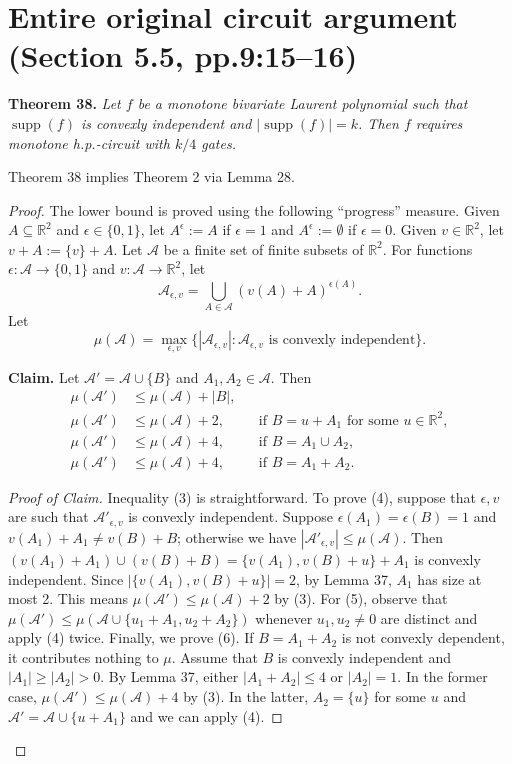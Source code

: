\documentclass[10pt,a4paper]{article}
\newcommand{\supp}{\operatorname{supp}}
\newenvironment{sourceresult}[1]{\par\medskip\noindent\textbf{#1.}\itshape}{\par\medskip}
\begin{document}
\section*{Entire original circuit argument (Section 5.5, pp.9:15--16)}
\begin{sourceresult}{Theorem 38}
Let $f$ be a monotone bivariate Laurent polynomial such that $\supp(f)$ is convexly independent and $|\supp(f)|=k$. Then $f$ requires monotone h.p.-circuit with $k/4$ gates.
\end{sourceresult}
Theorem 38 implies Theorem 2 via Lemma 28.
\begin{proof}
The lower bound is proved using the following ``progress'' measure. Given $A\subseteq\mathbb R^2$ and $\epsilon\in\{0,1\}$, let $A^\epsilon:=A$ if $\epsilon=1$ and $A^\epsilon:=\emptyset$ if $\epsilon=0$. Given $v\in\mathbb R^2$, let $v+A:=\{v\}+A$. Let $\mathcal A$ be a finite set of finite subsets of $\mathbb R^2$. For functions $\epsilon:\mathcal A\to\{0,1\}$ and $v:\mathcal A\to\mathbb R^2$, let
\[\mathcal A_{\epsilon,v}=\bigcup_{A\in\mathcal A}(v(A)+A)^{\epsilon(A)}.\]
Let
\[\mu(\mathcal A)=\max_{\epsilon,v}\{|\mathcal A_{\epsilon,v}|:\mathcal A_{\epsilon,v}\text{ is convexly independent}\}.\]
\par\medskip\noindent\textbf{Claim.} Let $\mathcal A'=\mathcal A\cup\{B\}$ and $A_1,A_2\in\mathcal A$. Then
\begin{align}
\mu(\mathcal A')&\le\mu(\mathcal A)+|B|,\tag{3}\\
\mu(\mathcal A')&\le\mu(\mathcal A)+2,&&\text{if }B=u+A_1\text{ for some }u\in\mathbb R^2,\tag{4}\\
\mu(\mathcal A')&\le\mu(\mathcal A)+4,&&\text{if }B=A_1\cup A_2,\tag{5}\\
\mu(\mathcal A')&\le\mu(\mathcal A)+4,&&\text{if }B=A_1+A_2.\tag{6}
\end{align}
\begin{proof}[Proof of Claim]
Inequality (3) is straightforward.
To prove (4), suppose that $\epsilon,v$ are such that $\mathcal A'_{\epsilon,v}$ is convexly independent. Suppose $\epsilon(A_1)=\epsilon(B)=1$ and $v(A_1)+A_1\ne v(B)+B$; otherwise we have $|\mathcal A'_{\epsilon,v}|\le\mu(\mathcal A)$. Then $(v(A_1)+A_1)\cup(v(B)+B)=\{v(A_1),v(B)+u\}+A_1$ is convexly independent. Since $|\{v(A_1),v(B)+u\}|=2$, by Lemma 37, $A_1$ has size at most 2. This means $\mu(\mathcal A')\le\mu(\mathcal A)+2$ by (3).
For (5), observe that $\mu(\mathcal A')\le\mu(\mathcal A\cup\{u_1+A_1,u_2+A_2\})$ whenever $u_1,u_2\ne0$ are distinct and apply (4) twice.
Finally, we prove (6). If $B=A_1+A_2$ is not convexly dependent, it contributes nothing to $\mu$. Assume that $B$ is convexly independent and $|A_1|\ge|A_2|>0$. By Lemma 37, either $|A_1+A_2|\le4$ or $|A_2|=1$. In the former case, $\mu(\mathcal A')\le\mu(\mathcal A)+4$ by (3). In the latter, $A_2=\{u\}$ for some $u$ and $\mathcal A'=\mathcal A\cup\{u+A_1\}$ and we can apply (4).

\end{proof}
\end{proof}
\end{document}
